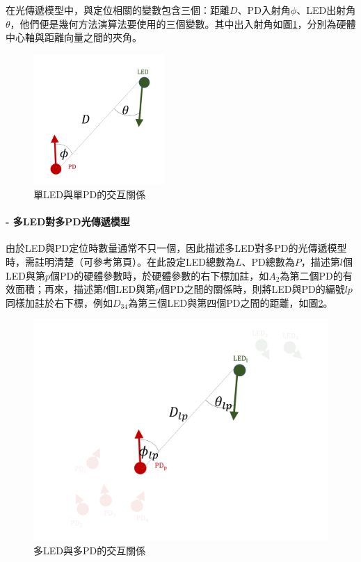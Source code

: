         在光傳遞模型中，與定位相關的變數包含三個：距離$D$、PD入射角$\phi$、LED出射角$\theta$，他們便是幾何方法演算法要使用的三個變數。其中出入射角如圖\ref{pic:interactive_1to1}，分別為硬體中心軸與距離向量之間的夾角。
    
        \begin{figure}[htpb]
            \centering
            \includegraphics[width=5cm]{ch2pic/interactive_1to1.png}
            \caption{單LED與單PD的交互關係}
            \label{pic:interactive_1to1}
        \end{figure}

        \paragraph*{- 多LED對多PD光傳遞模型}

        \hfill
    
        由於LED與PD定位時數量通常不只一個，因此描述多LED對多PD的光傳遞模型時，需註明清楚（可參考第\pageref{chp:symbol}頁）。在此設定LED總數為$L$、PD總數為$P$，描述第$l$個LED與第$p$個PD的硬體參數時，於硬體參數的右下標加註，如$A_2$為第二個PD的有效面積；再來，描述第$l$個LED與第$p$個PD之間的關係時，則將LED與PD的編號$lp$同樣加註於右下標，例如$D_{34}$為第三個LED與第四個PD之間的距離，如圖\ref{pic:interactive_mul}。
        
        \begin{figure}[htpb]
            \centering
            \includegraphics[width=12cm]{ch2pic/interactive_mul.png}
            \caption{多LED與多PD的交互關係}
            \label{pic:interactive_mul}
        \end{figure}
    

